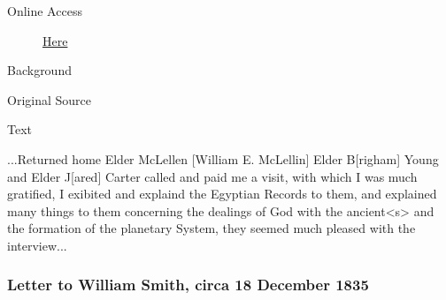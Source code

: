 			\begin{description}
				\item[Online Access] \href{https://www.josephsmithpapers.org/paper-summary/journal-1835-1836/70}{Here}
			\end{description}
			
			\begin{description}
				\item[Background]
			\end{description}
			
			
			\begin{description}
				\item[Original Source]
			\end{description}
			
			
			\begin{description}
				\item[Text]
			\end{description}
			
				...Returned home Elder McLellen [William E. McLellin] Elder B[righam] Young and Elder J[ared] Carter called and paid me a visit, with which I was much gratified, I exibited and explaind the Egyptian Records to them, and explained many things to them concerning the dealings of God with the ancient<s> and the formation of the planetary System, they seemed much pleased with the interview...

		\subsubsection{Letter to William Smith, circa 18 December 1835}
			\label{EMS-1835-JS-CIR-18-DEC-1835}
			
